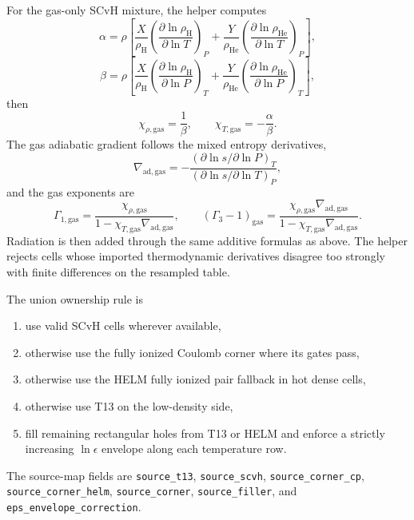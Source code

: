 \documentclass[11pt]{article}
\newcommand{\eps}{\epsilon}
\begin{document}
For the gas-only SCvH mixture, the helper computes
\begin{equation}
  \alpha =
  \rho\left[
  \frac{X}{\rho_{\mathrm H}}
  \left(\frac{\partial\ln\rho_{\mathrm H}}{\partial\ln T}\right)_P
  +\frac{Y}{\rho_{\mathrm{He}}}
  \left(\frac{\partial\ln\rho_{\mathrm{He}}}{\partial\ln T}\right)_P
  \right],
\end{equation}
\begin{equation}
  \beta =
  \rho\left[
  \frac{X}{\rho_{\mathrm H}}
  \left(\frac{\partial\ln\rho_{\mathrm H}}{\partial\ln P}\right)_T
  +\frac{Y}{\rho_{\mathrm{He}}}
  \left(\frac{\partial\ln\rho_{\mathrm{He}}}{\partial\ln P}\right)_T
  \right],
\end{equation}
then
\begin{equation}
  \chi_{\rho,\mathrm{gas}}=\frac{1}{\beta},\qquad
  \chi_{T,\mathrm{gas}}=-\frac{\alpha}{\beta}.
\end{equation}
The gas adiabatic gradient follows the mixed entropy derivatives,
\begin{equation}
  \nabla_{\mathrm{ad,gas}} =
  -\frac{(\partial\ln s/\partial\ln P)_T}
        {(\partial\ln s/\partial\ln T)_P},
\end{equation}
and the gas exponents are
\begin{equation}
  \Gamma_{1,\mathrm{gas}}=
  \frac{\chi_{\rho,\mathrm{gas}}}
       {1-\chi_{T,\mathrm{gas}}\nabla_{\mathrm{ad,gas}}},
  \qquad
  (\Gamma_3-1)_{\mathrm{gas}}=
  \frac{\chi_{\rho,\mathrm{gas}}\nabla_{\mathrm{ad,gas}}}
       {1-\chi_{T,\mathrm{gas}}\nabla_{\mathrm{ad,gas}}}.
\end{equation}
Radiation is then added through the same additive formulas as above.  The
helper rejects cells whose imported thermodynamic derivatives disagree too
strongly with finite differences on the resampled table.

The union ownership rule is
\begin{enumerate}
  \item use valid SCvH cells wherever available,
  \item otherwise use the fully ionized Coulomb corner where its gates pass,
  \item otherwise use the HELM fully ionized pair fallback in hot dense cells,
  \item otherwise use T13 on the low-density side,
  \item fill remaining rectangular holes from T13 or HELM and enforce a
        strictly increasing $\ln\eps$ envelope along each temperature row.
\end{enumerate}
The source-map fields are \texttt{source\_t13}, \texttt{source\_scvh},
\texttt{source\_corner\_cp}, \texttt{source\_corner\_helm},
\texttt{source\_corner}, \texttt{source\_filler}, and
\texttt{eps\_envelope\_correction}.
\end{document}
